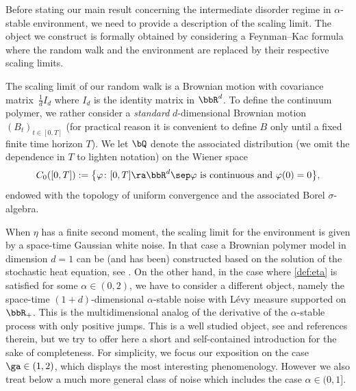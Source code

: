 Before stating our main result concerning the intermediate disorder regime in $\alpha$\nobreakdash-stable environment, we need to provide a description of the scaling limit. The object we construct is formally obtained by
considering a Feynman--Kac formula where the random walk and the environment are replaced by their respective scaling limits.

The scaling limit of our random walk is a Brownian motion with covariance matrix~$\frac{1}{d} I_d$ where $I_d$ is the identity matrix in $\bbR^d$.
To define the continuum polymer,
we rather consider a \emph{standard} $d$-dimensional Brownian motion $(B_t)_{t\in [0,T]}$ (for practical reason it is convenient to define $B$ only until a fixed finite time horizon $T$).
We let $\bQ$ denote the associated distribution (we omit the dependence in $T$ to lighten notation) on the Wiener space
\begin{equation}%
C_0([0,T]):= \bigl\{ \varphi \colon [0,T]\ra \bbR^d \sep \varphi \text{ is continuous and } \varphi(0)=0 \bigr\},
\end{equation}
endowed with the topology of uniform convergence and the associated Borel $\sigma$-algebra.

When $\eta$ has a finite second moment, the scaling limit for the environment is given by a space-time Gaussian white noise. In that case a Brownian polymer model in dimension $d=1$ can be (and has been) constructed based on the solution of the stochastic heat equation, see \cite{AKQ14b}.
On the other hand, in the case where \eqref{def:eta} is satisfied for some $\alpha\in (0,2)$,
we have to consider a different object, namely
the space-time $(1+d)$-dimensional $\alpha$-stable noise with Lévy measure supported on $\bbR_+$. This is the multidimensional analog of the derivative of the $\alpha$-stable process with only positive jumps.
This is a well studied object, see \cite{FFU17} and references therein, but we try to offer here a short and self-contained introduction for the sake of completeness.
For simplicity, we focus our exposition on the
case $\ga\in (1,2)$, which displays the most interesting phenomenology. However we also treat below a much more general class of noise which includes the case
$\alpha \in (0,1]$.

